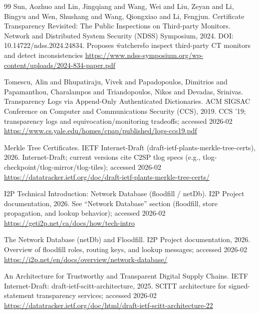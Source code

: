 \documentclass[11pt]{article}
\begin{document}
\begin{thebibliography}{99}
Sun, Aozhuo and Lin, Jingqiang and Wang, Wei and Liu, Zeyan and Li, Bingyu and Wen, Shushang and Wang, Qiongxiao and Li, Fengjun.
\newblock Certificate Transparency Revisited: The Public Inspections on Third-party Monitors.
\newblock Network and Distributed System Security (NDSS) Symposium, 2024.
\newblock DOI: 10.14722/ndss.2024.24834.
\newblock Proposes \"watchers\" to inspect third-party CT monitors and detect inconsistencies
\newblock \url{https://www.ndss-symposium.org/wp-content/uploads/2024-834-paper.pdf}

Tomescu, Alin and Bhupatiraju, Vivek and Papadopoulos, Dimitrios and Papamanthou, Charalampos and Triandopoulos, Nikos and Devadas, Srinivas.
\newblock Transparency Logs via Append-Only Authenticated Dictionaries.
\newblock ACM SIGSAC Conference on Computer and Communications Security (CCS), 2019.
\newblock CCS '19; transparency logs and equivocation/monitoring tradeoffs; accessed 2026-02
\newblock \url{https://www.cs.yale.edu/homes/cpap/published/logs-ccs19.pdf}

\newblock Merkle Tree Certificates.
\newblock IETF Internet-Draft (draft-ietf-plants-merkle-tree-certs), 2026.
\newblock Internet-Draft; current versions cite C2SP tlog specs (e.g., tlog-checkpoint/tlog-mirror/tlog-tiles); accessed 2026-02
\newblock \url{https://datatracker.ietf.org/doc/draft-ietf-plants-merkle-tree-certs/}

\newblock I2P Technical Introduction: Network Database (floodfill / netDb).
\newblock I2P Project documentation, 2026.
\newblock See ``Network Database'' section (floodfill, store propagation, and lookup behavior); accessed 2026-02
\newblock \url{https://geti2p.net/ca/docs/how/tech-intro}

\newblock The Network Database (netDb) and Floodfill.
\newblock I2P Project documentation, 2026.
\newblock Overview of floodfill roles, routing keys, and lookup messages; accessed 2026-02
\newblock \url{https://i2p.net/en/docs/overview/network-database/}

\newblock An Architecture for Trustworthy and Transparent Digital Supply Chains.
\newblock IETF Internet-Draft: draft-ietf-scitt-architecture, 2025.
\newblock SCITT architecture for signed-statement transparency services; accessed 2026-02
\newblock \url{https://datatracker.ietf.org/doc/html/draft-ietf-scitt-architecture-22}


\end{thebibliography}
\end{document}
